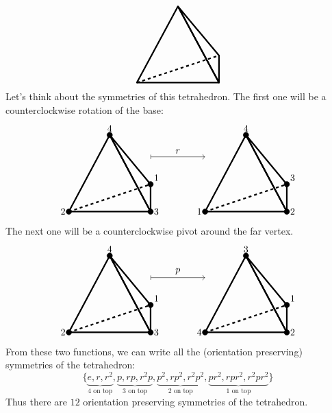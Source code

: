 \documentclass{ximera}
\begin{document}
\[
\begin{tikzpicture}
  \draw[ultra thick,rounded corners=.05mm] (0,0) -- (3,0) -- (1.5,2.8) -- cycle;
  \draw[ultra thick,rounded corners=.05mm] (3,1) -- (3,0) -- (1.5,2.8) -- cycle;
  \draw[ultra thick,dashed] (0,0) -- (3,1);
\end{tikzpicture}
\]
Let's think about the symmetries of this tetrahedron. The first one
will be a counterclockwise rotation of the base:
\[
\begin{tikzpicture}
  \draw[ultra thick,rounded corners=.05mm] (0,0) -- (3,0) -- (1.5,2.8) -- cycle;
  \draw[ultra thick,rounded corners=.05mm] (3,1) -- (3,0) -- (1.5,2.8) -- cycle;
  \draw[ultra thick,dashed] (0,0) -- (3,1);
  \draw[fill] (3,1) circle (1mm) node[above right] {$1$};
  \draw[fill] (0,0) circle (1mm) node[left] {$2$};
  \draw[fill] (3,0) circle (1mm) node[right] {$3$};
  \draw[fill] (1.5,2.8) circle (1mm) node[above] {$4$};

  \draw[|->] (3,2) -- (5,2);
  \node[above] at (4,2) {$r$};
  
  \draw[ultra thick,rounded corners=.05mm] (5,0) -- (8,0) -- (6.5,2.8) -- cycle;
  \draw[ultra thick,rounded corners=.05mm] (8,1) -- (8,0) -- (6.5,2.8) -- cycle;
  \draw[ultra thick,dashed] (5,0) -- (8,1);
  \draw[fill] (8,1) circle (1mm) node[above right] {$3$};
  \draw[fill] (5,0) circle (1mm) node[left] {$1$};
  \draw[fill] (8,0) circle (1mm) node[right] {$2$};
  \draw[fill] (6.5,2.8) circle (1mm) node[above] {$4$};
\end{tikzpicture}
\]
The next one will be a counterclockwise pivot around the far vertex. 
\[
\begin{tikzpicture}
  \draw[ultra thick,rounded corners=.05mm] (0,0) -- (3,0) -- (1.5,2.8) -- cycle;
  \draw[ultra thick,rounded corners=.05mm] (3,1) -- (3,0) -- (1.5,2.8) -- cycle;
  \draw[ultra thick,dashed] (0,0) -- (3,1);
  \draw[fill] (3,1) circle (1mm) node[above right] {$1$};
  \draw[fill] (0,0) circle (1mm) node[left] {$2$};
  \draw[fill] (3,0) circle (1mm) node[right] {$3$};
  \draw[fill] (1.5,2.8) circle (1mm) node[above] {$4$};

  \draw[|->] (3,2) -- (5,2);
  \node[above] at (4,2) {$p$};
  
  \draw[ultra thick,rounded corners=.05mm] (5,0) -- (8,0) -- (6.5,2.8) -- cycle;
  \draw[ultra thick,rounded corners=.05mm] (8,1) -- (8,0) -- (6.5,2.8) -- cycle;
  \draw[ultra thick,dashed] (5,0) -- (8,1);
  \draw[fill] (8,1) circle (1mm) node[above right] {$1$};
  \draw[fill] (5,0) circle (1mm) node[left] {$4$};
  \draw[fill] (8,0) circle (1mm) node[right] {$2$};
  \draw[fill] (6.5,2.8) circle (1mm) node[above] {$3$};
\end{tikzpicture}
\]
From these two functions, we can write all the (orientation
preserving) symmetries of the tetrahedron:
\[
\{\underbrace{e,r,r^2}_{\text{$4$ on top}}, \underbrace{p,rp,r^2p}_{\text{$3$ on top}}, \underbrace{p^2,rp^2,r^2p^2}_{\text{$2$ on top}},\underbrace{pr^2,rpr^2,r^2pr^2}_{\text{$1$ on top}}\}
\]
Thus there are $12$ orientation preserving symmetries of the
tetrahedron.
\end{document}

